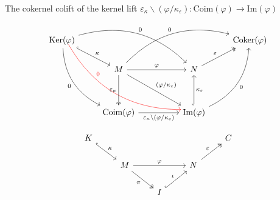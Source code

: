 The cokernel colift of the kernel lift
$\varepsilon_{\kappa}\backslash(\varphi/\kappa_{\varepsilon}) : \mathrm{Coim}(\varphi) \rightarrow \mathrm{Im}(\varphi)$

\[
\begin{tikzcd}
\mathrm{Ker}(\varphi) \arrow[rd, "\kappa", hook] \arrow[rddd, "0"', bend right] \arrow[rrrd, "0", bend left] \arrow[rrrddd, "0", pos=.3, color=red, shift left=2, bend right] &                                                                                                                                                    &  &                                                                                               & \mathrm{Coker}(\varphi) \\
                                                                                                                                             & M \arrow[rrru, "0", bend left] \arrow[rr, "\varphi"] \arrow[dd, "\varepsilon_{\kappa}"', two heads] \arrow[rrdd, "(\varphi/\kappa_{\varepsilon})"] &  & N \arrow[ru, "\varepsilon", two heads]                                                        &                         \\
                                                                                                                                             &                                                                                                                                                    &  &                                                                                               &                         \\
                                                                                                                                             & \mathrm{Coim}(\varphi) \arrow[rr, "\varepsilon_{\kappa}\backslash(\varphi/\kappa_{\varepsilon})"']                                                 &  & \mathrm{Im}(\varphi) \arrow[uu, "\kappa_{\varepsilon}"', hook] \arrow[ruuu, "0"', bend right] &                        
\end{tikzcd}
\]






\begin{corollary}\label{cor:kernel_cokernel_sequence}
\[
\begin{tikzcd}
K \arrow[rd, "\kappa", hook] &                                                       &                             &                                        & C \\
                             & M \arrow[rr, "\varphi"] \arrow[rd, "\pi"', two heads] &                             & N \arrow[ru, "\varepsilon", two heads] &   \\
                             &                                                       & I \arrow[ru, "\iota", hook] &                                        &  
\end{tikzcd}
\]
\end{corollary}

